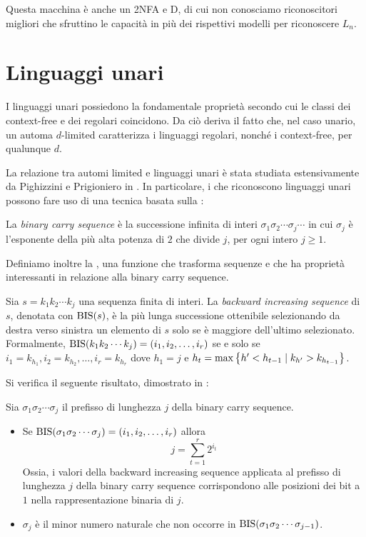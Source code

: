 Questa macchina è anche un 2NFA e D, di cui non conosciamo riconoscitori migliori che sfruttino le capacità in più dei rispettivi modelli per riconoscere $L_n$.



\section{Linguaggi unari}\label{sec:wit:un}
I linguaggi unari possiedono la fondamentale proprietà secondo cui le classi dei context-free e dei regolari coincidono. Da ciò deriva il fatto che, nel caso unario, un automa $d$-limited caratterizza i linguaggi regolari, nonché i context-free, per qualunque $d$.

La relazione tra automi limited e linguaggi unari è stata studiata estensivamente da Pighizzini e Prigioniero in \cite{Pighizzini:19:limitedunary}. In particolare, i  che riconoscono linguaggi unari possono fare uso di una tecnica basata sulla :
\begin{defin}
	La \emph{binary carry sequence} è la successione infinita di interi $\sigma_1\sigma_2\cdots\sigma_j\cdots$ in cui $\sigma_j$ è l'esponente della più alta potenza di $2$ che divide $j$, per ogni intero $j\geq1$.
\end{defin}

Definiamo inoltre la , una funzione che trasforma sequenze e che ha proprietà interessanti in relazione alla binary carry sequence.
\begin{defin}
	Sia $s=k_1k_2\cdots k_j$ una sequenza finita di interi. La \emph{backward increasing sequence} di $s$, denotata con $\mathrm{BIS}(s)$, è la più lunga successione ottenibile selezionando da destra verso sinistra un elemento di $s$ solo se è maggiore dell'ultimo selezionato. Formalmente, $\mathrm{BIS}(k_1k_2\cdots k_j)=(i_1,i_2,\dots,i_r)$ se e solo se $i_1=k_{h_1},i_2=k_{h_2},\dots,i_r=k_{h_r}$ dove $h_1=j$ e $h_t=\max\left\{ h'<h_{t-1}\mid k_{h'}>k_{h_{t-1}} \right\}$.
\end{defin}

Si verifica il seguente risultato, dimostrato in \cite{Pighizzini:19:limitedunary}:
\begin{lemma}\label{lem:wit:bis}
	Sia $\sigma_1\sigma_2\cdots\sigma_j$ il prefisso di lunghezza $j$ della binary carry sequence.
	\begin{itemize}
		\item \label{lem:wit:bis:1} Se $\mathrm{BIS}(\sigma_1\sigma_2\cdots\sigma_j)=(i_1,i_2,\dots,i_r)$ allora
		      \begin{equation*}
			      j=\sum_{t=1}^r 2^{i_t}
		      \end{equation*}
		      Ossia, i valori della backward increasing sequence applicata al prefisso di lunghezza $j$ della binary carry sequence corrispondono alle posizioni dei bit a $1$ nella rappresentazione binaria di $j$.
		\item \label{lem:wit:bis:2} $\sigma_j$ è il minor numero naturale che non occorre in $\mathrm{BIS}(\sigma_1\sigma_2\cdots\sigma_{j-1})$.
	\end{itemize}
\end{lemma}

